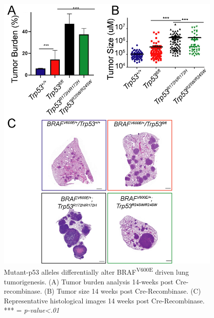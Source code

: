 \begin{figure}
\hypertarget{fig:3.2}{%
\centering
\includegraphics[width=1\textwidth,height=\textheight]{images/p53_2.png}
\caption{Mutant-p53 alleles differentially alter BRAF\textsuperscript{V600E} driven lung tumorigenesis. (A) Tumor burden analysis 14-weeks post Cre-recombinase. (B) Tumor size 14 weeks post Cre-Recombinase. (C) Representative histological images 14 weeks post Cre-Recombinase. *** = \emph{p-value\textless.01}}\label{fig:3.2}
}
\end{figure}

